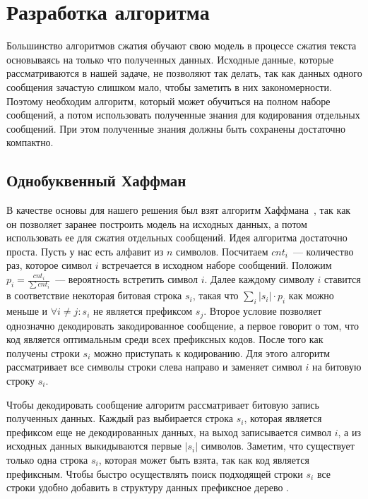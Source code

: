 \chapter{Разработка алгоритма}

Большинство алгоритмов сжатия обучают свою модель в процессе сжатия текста основываясь на только что полученных данных. 
Исходные данные, которые рассматриваются в нашей задаче, не позволяют так делать, так как данных
 одного сообщения зачастую слишком мало, чтобы заметить в них закономерности. Поэтому необходим алгоритм, 
 который может обучиться на полном наборе сообщений, а потом использовать полученные знания для кодирования 
 отдельных сообщений. При этом полученные знания должны быть сохранены достаточно компактно. 

\section{Однобуквенный Хаффман}
В качестве основы для нашего решения был взят алгоритм Хаффмана~\cite{huffman}, 
так как он позволяет заранее построить модель на исходных данных, а потом использовать ее для сжатия 
отдельных сообщений. Идея  алгоритма достаточно проста. Пусть у нас есть алфавит из $n$ символов. 
Посчитаем $cnt_i$~--- количество раз, которое символ $i$ встречается в исходном наборе сообщений.
 Положим $p_i = \frac{cnt_i}{\sum{cnt_i}}$~--- вероятность встретить символ $i$. Далее каждому символу $i$ ставится 
 в соответствие некоторая битовая строка $s_i$, такая что $\sum\limits_{i} |s_i| \cdot p_i$ как можно меньше и 
  $\forall i \neq j : s_i \text{ не является префиксом } s_j$. Второе условие позволяет однозначно декодировать закодированное
   сообщение, а первое говорит о том, что код является оптимальным среди всех префиксных кодов.
После того как получены строки $s_i$ можно приступать к кодированию. Для этого алгоритм рассматривает все
 символы строки слева направо и заменяет символ $i$ на битовую строку $s_i$.

Чтобы декодировать сообщение алгоритм рассматривает битовую запись полученных данных. Каждый раз
 выбирается строка $s_i$, которая является префиксом еще не декодированных данных, на выход записывается 
 символ $i$, а из исходных данных выкидываются первые $|s_i|$ символов. Заметим, что существует только 
 одна строка $s_i$, которая может быть взята, так как код является префиксным. Чтобы быстро осуществлять
  поиск подходящей строки $s_i$ все строки удобно добавить в структуру данных префиксное дерево \cite{knuth}.

